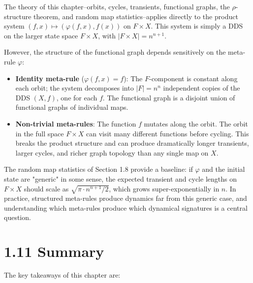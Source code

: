 The theory of this chapter--orbits, cycles, transients, functional graphs, the $\rho$-structure theorem, and random map statistics--applies directly to the product system $(f, x) \mapsto (\varphi(f,x), f(x))$ on $F \times X$. This system is simply a DDS on the larger state space $F \times X$, with $|F \times X| = n^{n+1}$.

However, the structure of the functional graph depends sensitively on the meta-rule $\varphi$:

\begin{itemize}
  \item \textbf{Identity meta-rule} ($\varphi(f,x) = f$): The $F$-component is constant along each orbit; the system decomposes into $|F| = n^n$ independent copies of the DDS $(X, f)$, one for each $f$. The functional graph is a disjoint union of functional graphs of individual maps.
\end{itemize}

\begin{itemize}
  \item \textbf{Non-trivial meta-rules}: The function $f$ mutates along the orbit. The orbit in the full space $F \times X$ can visit many different functions before cycling. This breaks the product structure and can produce dramatically longer transients, larger cycles, and richer graph topology than any single map on $X$.
\end{itemize}

The random map statistics of Section 1.8 provide a baseline: if $\varphi$ and the initial state are "generic" in some sense, the expected transient and cycle lengths on $F \times X$ should scale as $\sqrt{\pi \cdot n^{n+1}/2}$, which grows super-exponentially in $n$. In practice, structured meta-rules produce dynamics far from this generic case, and understanding which meta-rules produce which dynamical signatures is a central question.

\section{1.11 Summary}

The key takeaways of this chapter are:

